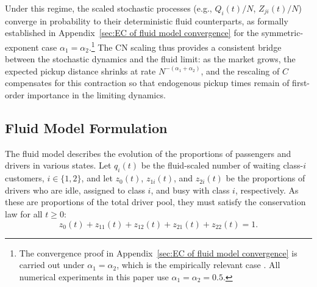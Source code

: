 Under this regime, the scaled stochastic processes (e.g., $Q_i(t)/N$, $Z_{ji}(t)/N$) converge in probability to their deterministic fluid counterparts, as formally established in Appendix~\ref{sec:EC of fluid model convergence} for the symmetric-exponent case $\alpha_1 = \alpha_2$.\footnote{The convergence proof in Appendix~\ref{sec:EC of fluid model convergence} is carried out under $\alpha_1 = \alpha_2$, which is the empirically relevant case \citep{WangZhangHu2024}. All numerical experiments in this paper use $\alpha_1 = \alpha_2 = 0.5$.}
The CN scaling thus provides a consistent bridge between the stochastic dynamics and the fluid limit: as the market grows, the expected pickup distance shrinks at rate $N^{-(\alpha_1+\alpha_2)}$, and the rescaling of $C$ compensates for this contraction so that endogenous pickup times remain of first-order importance in the limiting dynamics.

\subsection{Fluid Model Formulation}
\label{sec:fluid_model_formulation}
The fluid model describes the evolution of the proportions of passengers and drivers in various states.
Let $q_i(t)$ be the fluid-scaled number of waiting class-$i$ customers, $i \in \{1, 2\}$, and let $z_0(t)$, $z_{1i}(t)$, and $z_{2i}(t)$ be the proportions of drivers who are idle, assigned to class $i$, and busy with class $i$, respectively.
As these are proportions of the total driver pool, they must satisfy the conservation law for all $t \ge 0$:
\begin{equation}
z_0(t) + z_{11}(t) + z_{12}(t) + z_{21}(t) + z_{22}(t) = 1.
\label{eq:fluid_conservation}
\end{equation}

